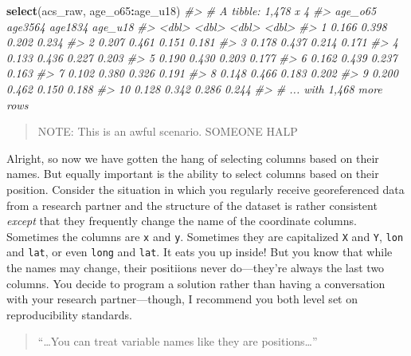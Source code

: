 \documentclass[
]{book}
\newenvironment{Shaded}{\begin{snugshade}}{\end{snugshade}}
\newcommand{\CommentTok}[1]{\textcolor[rgb]{0.56,0.35,0.01}{\textit{#1}}}
\newcommand{\KeywordTok}[1]{\textcolor[rgb]{0.13,0.29,0.53}{\textbf{#1}}}
\newcommand{\NormalTok}[1]{#1}
\newcommand{\OperatorTok}[1]{\textcolor[rgb]{0.81,0.36,0.00}{\textbf{#1}}}
\begin{document}
\begin{Shaded}
\begin{Highlighting}[]
\KeywordTok{select}\NormalTok{(acs\_raw, age\_o65}\OperatorTok{:}\NormalTok{age\_u18)}
\CommentTok{\#\textgreater{} \# A tibble: 1,478 x 4}
\CommentTok{\#\textgreater{}    age\_o65 age3564 age1834 age\_u18}
\CommentTok{\#\textgreater{}      \textless{}dbl\textgreater{}   \textless{}dbl\textgreater{}   \textless{}dbl\textgreater{}   \textless{}dbl\textgreater{}}
\CommentTok{\#\textgreater{}  1   0.166   0.398   0.202   0.234}
\CommentTok{\#\textgreater{}  2   0.207   0.461   0.151   0.181}
\CommentTok{\#\textgreater{}  3   0.178   0.437   0.214   0.171}
\CommentTok{\#\textgreater{}  4   0.133   0.436   0.227   0.203}
\CommentTok{\#\textgreater{}  5   0.190   0.430   0.203   0.177}
\CommentTok{\#\textgreater{}  6   0.162   0.439   0.237   0.163}
\CommentTok{\#\textgreater{}  7   0.102   0.380   0.326   0.191}
\CommentTok{\#\textgreater{}  8   0.148   0.466   0.183   0.202}
\CommentTok{\#\textgreater{}  9   0.200   0.462   0.150   0.188}
\CommentTok{\#\textgreater{} 10   0.128   0.342   0.286   0.244}
\CommentTok{\#\textgreater{} \# ... with 1,468 more rows}
\end{Highlighting}
\end{Shaded}

\begin{quote}
NOTE: This is an awful scenario. SOMEONE HALP
\end{quote}

Alright, so now we have gotten the hang of selecting columns based on their names. But equally important is the ability to select columns based on their position. Consider the situation in which you regularly receive georeferenced data from a research partner and the structure of the dataset is rather consistent \emph{except} that they frequently change the name of the coordinate columns. Sometimes the columns are \texttt{x} and \texttt{y}. Sometimes they are capitalized \texttt{X} and \texttt{Y}, \texttt{lon} and \texttt{lat}, or even \texttt{long} and \texttt{lat}. It eats you up inside! But you know that while the names may change, their positiions never do---they're always the last two columns. You decide to program a solution rather than having a conversation with your research partner---though, I recommend you both level set on reproducibility standards.

\begin{quote}
``\ldots You can treat variable names like they are positions\ldots{}''
\end{quote}
\end{document}
